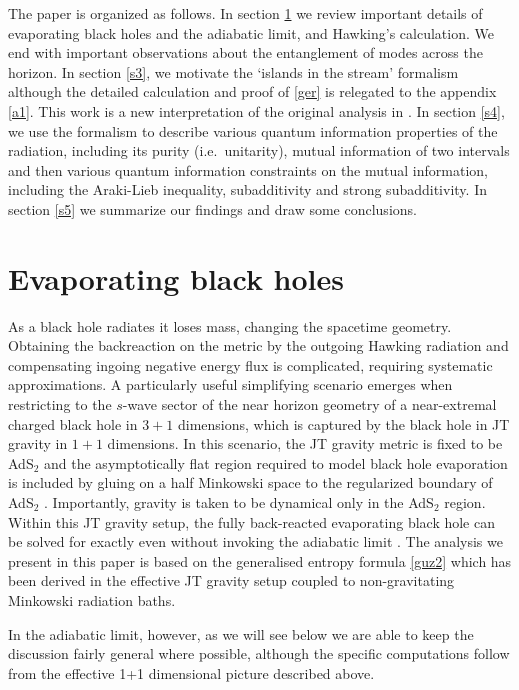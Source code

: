 \documentclass[12pt]{article}
\begin{document}
The paper is organized as follows. In section \ref{s2} we review important details of evaporating black holes and the adiabatic limit, and Hawking's calculation. We end with important observations about the entanglement of modes across the horizon. In section \ref{s3}, we motivate the `islands in the stream' formalism although the detailed calculation and proof of \eqref{ger} is relegated to the appendix \ref{a1}. This work is a new interpretation of the original analysis in \cite{Hollowood:2020kvk}. In section \ref{s4}, we use the formalism to describe various quantum information properties of the radiation, including its purity (i.e.~unitarity), mutual information of two intervals and then various quantum information constraints on the mutual information, including the Araki-Lieb inequality, subadditivity and strong subadditivity. In section \ref{s5} we summarize our findings and draw some conclusions.

\section{Evaporating black holes}\label{s2}

As a black hole radiates it loses mass, changing the spacetime geometry. Obtaining the backreaction on the metric by the outgoing Hawking radiation and compensating ingoing negative energy flux is complicated, requiring systematic approximations.  A particularly useful simplifying scenario emerges when restricting to the $s$-wave sector of the near horizon geometry of a near-extremal charged black hole in $3+1$ dimensions, which is captured by the black hole in JT gravity in $1+1$ dimensions. In this scenario, the JT gravity metric is fixed to be AdS$_2$ and the asymptotically flat region required to model black hole evaporation is included by gluing on a half Minkowski space to the  regularized boundary of AdS$_2$ 
\cite{Almheiri:2019psf,Almheiri:2019yqk,Almheiri:2019qdq}. Importantly, gravity is taken to be dynamical only in the AdS$_2$ region.  Within this JT gravity setup,  the fully back-reacted evaporating black hole can be solved for exactly even without invoking the adiabatic limit \cite{Almheiri:2019psf,Hollowood:2020cou}. The analysis we present in this paper is based on the generalised entropy formula \eqref{guz2} which has been derived in the effective JT gravity setup coupled to non-gravitating Minkowski radiation baths.


In the adiabatic limit, however, as we will see below  we are able to  keep the discussion fairly general 
where possible, although the specific computations follow from the effective 1+1 dimensional picture described above. 
\end{document}

